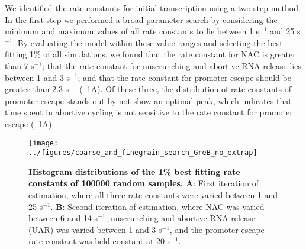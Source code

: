 %

We identified the rate constants for initial transcription using a two-step
method. In the first step we performed a broad parameter search by considering
the minimum and maximum values of all rate constants to lie between 1 s$^{-1}$
and 25 s$^{-1}$. By evaluating the model within these value ranges and
selecting the best fitting 1\% of all simulations, we found that the rate
constant for NAC is greater than 7 s$^{-1}$; that the rate constant for
unscrunching and abortive RNA release lies between 1 and 3 s$^{-1}$; and that
the rate constant for promoter escape should be greater than 2.3 s$^{-1}$
(\FIG~\ref{fig:parameter_estimation_proper}A). Of these three, the
distribution of rate constants of promoter escape stands out by not show an
optimal peak, which indicates that time spent in abortive cycling is not
sensitive to the rate constant for promoter escape
(\FIG~\ref{fig:parameter_estimation_proper}A).

\begin{figure}[h]
    \begin{center}
      \texttt{[image: ../figures/coarse\_and\_finegrain\_search\_GreB\_no\_extrap]}
    \end{center}
  \caption{ {\bf Histogram distributions of the 1\% best fitting rate
    constants of 100000 random samples.} \textbf{A}: First iteration of
    estimation, where all three rate constants were varied between 1 and 25
    s$^{-1}$. \textbf{B}: Second iteration of estimation, where NAC was varied
    between 6 and 14 s$^{-1}$, unscrunching and abortive RNA release (UAR)
    was varied between 1 and 3 s$^{-1}$, and the promoter escape rate constant was
    held constant at 20 s$^{-1}$.}
    \label{fig:parameter_estimation_proper}
\end{figure}

